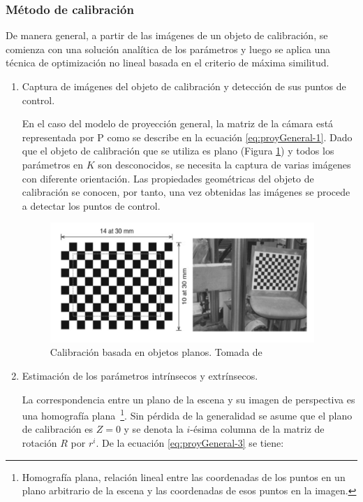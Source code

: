 \subsubsection{Método de calibración}

De manera general, a partir de las imágenes de un objeto de calibración, se comienza con una solución analítica de los parámetros y luego se aplica una técnica de optimización no lineal basada en el criterio de máxima similitud.

\begin{enumerate}
	\item Captura de imágenes del objeto de calibración y detección de sus puntos de control.
	
	En el caso del modelo de proyección general, la matriz de la cámara está representada por P como se describe en la ecuación \ref{eq:proyGeneral-1}. Dado que el objeto de calibración que se utiliza es plano (Figura \ref{fig:chess}) y todos los parámetros en $K$ son desconocidos, se necesita la captura de varias imágenes con diferente orientación. Las propiedades geométricas del objeto de calibración se conocen, por tanto, una vez obtenidas las imágenes se procede a detectar los puntos de control.
	
	\begin{figure}[ht]
		\centering
		\includegraphics[width=10cm]{./Graphics/chess.png}
		\caption{Calibración basada en objetos planos. Tomada de \cite{ching2022segm3d}}
		\label{fig:chess}
	\end{figure}
	\item Estimación de los parámetros intrínsecos y extrínsecos.
	
	La correspondencia entre un plano de la escena y su imagen de perspectiva es una homografía plana~\footnote{Homografía plana, relación lineal entre las coordenadas de los puntos en un plano arbitrario de la escena y las coordenadas de esos puntos en la imagen.}. Sin pérdida de la generalidad se asume que el plano de calibración es $Z = 0$ y se denota la $i$-ésima columna de la matriz de rotación $R$ por $r^i$. De la ecuación \ref{eq:proyGeneral-3} se tiene:
	

\end{enumerate}
